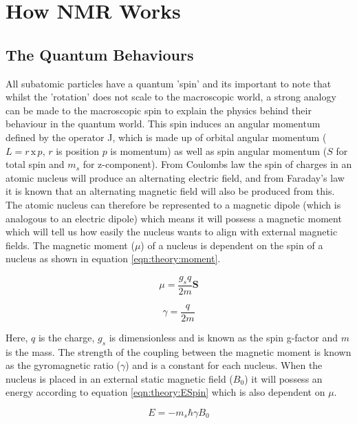\documentclass[class=article, crop=false]{standalone}
\begin{document}
 
\label{section:Theory}

\section{How NMR Works}
\subsection{The Quantum Behaviours}

All subatomic particles have a quantum 'spin' and its important to note that whilst the 'rotation' does not scale to the macroscopic world, a strong analogy can be made to the macroscopic spin to explain the physics behind their behaviour in the quantum world. This spin induces an angular momentum defined by the operator J, which is made up of orbital angular momentum ($L = r\, \textrm{x} \, p$, $r$ is position $p$ is momentum) as well as spin angular momentum ($S$ for total spin and $m_s$ for z-component). From Coulombs law\cite{Coulomb1785PremierMagnetisme} the spin of charges in an atomic nucleus will produce an alternating electric field, and from Faraday's law\cite{Faraday1821OnMagnetism} it is known that an alternating magnetic field will also be produced from this. The atomic nucleus can therefore be represented to a magnetic dipole (which is analogous to an electric dipole) which means it will possess a magnetic moment which will tell us how easily the nucleus wants to align with external magnetic fields. The magnetic moment ($\mu$) of a nucleus is dependent on the spin of a nucleus as shown in equation \ref{eqn:theory:moment}.

\begin{equation}
    \mu = \frac{g_sq}{2m} \mathbf{S}
    \label{eqn:theory:moment}
\end{equation}

\begin{equation}
    \gamma = \frac{q}{2m}
    \label{eqn:theory:gyro}
\end{equation}

Here, $q$ is the charge, $g_s$ is dimensionless and is known as the spin g-factor and $m$ is the mass. The strength of the coupling between the magnetic moment is known as the gyromagnetic ratio ($\gamma$) and is a constant for each nucleus. When the nucleus is placed in an external static magnetic field ($B_0$) it will possess an energy according to equation \ref{eqn:theory:ESpin} which is also dependent on $\mu$.

\begin{equation}
    E = -m_s\hbar \gamma B_0
    \label{eqn:theory:ESpin}
\end{equation}
\end{document}
